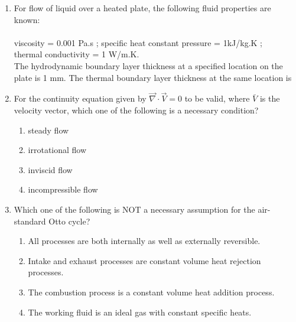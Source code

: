 \documentclass[journal,12pt,onecolumn]{IEEEtran}
\begin{document}
\begin{enumerate}
    \item For flow of liquid over a heated plate, the following fluid properties are known:\\\\
          viscosity = 0.001 Pa.s ; specific heat constant pressure = 1kJ/kg.K ;\\
          thermal conductivity = 1 W/m.K.\\
          The hydrodynamic boundary layer thickness at a specified location on the plate is 1 mm. The thermal boundary layer thickness at the same location is

          \begin{enumerate}
          \end{enumerate}

    \item For the continuity equation given by $\overrightarrow{\nabla}\cdot\overrightarrow{V} = 0$ to be valid, where $\bar{V}$ is the velocity vector, which one of the following is a necessary condition?\\

          \begin{enumerate}
              \item steady flow
              \item irrotational flow
              \item inviscid flow
              \item incompressible flow
          \end{enumerate}

    \item Which one of the following is NOT a necessary assumption for the air-standard Otto cycle?

          \begin{enumerate}
              \item All processes are both internally as well as externally reversible.
              \item Intake and exhaust processes are constant volume heat rejection processes.
              \item The combustion process is a constant volume heat addition process.
              \item The working fluid is an ideal gas with constant specific heats.
          \end{enumerate}


\end{enumerate}
\end{document}
